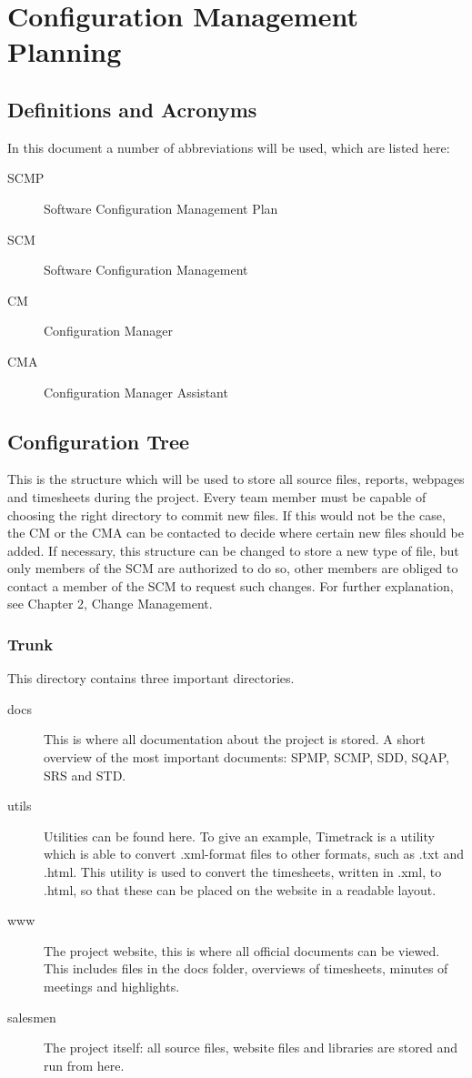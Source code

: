\chapter{Configuration Management Planning}

\section{Definitions and Acronyms}
In this document a number of abbreviations will be used, which are listed here:
\begin{description}
\item[SCMP]
Software Configuration Management Plan
\item[SCM]
Software Configuration Management
\item[CM]
Configuration Manager
\item[CMA]
Configuration Manager Assistant
\end{description}

\section{Configuration Tree}
This is the structure which will be used to store all source files, reports, webpages and timesheets during the project.
Every team member must be capable of choosing the right directory to commit new files.
If this would not be the case, the CM or the CMA can be contacted to decide where certain new files should be added.
If necessary, this structure can be changed to store a new type of file, but only members of the SCM are authorized to do so, other members are obliged to contact a member of the SCM to request such changes.
For further explanation, see Chapter 2, Change Management.

\subsection{Trunk}
This directory contains three important directories.
\begin{description}
\item[docs]
This is where all documentation about the project is stored. A short overview of the most important documents: SPMP, SCMP, SDD, SQAP, SRS and STD.
\item[utils]
Utilities can be found here.
To give an example, Timetrack is a utility which is able to convert .xml-format files to other formats, such as .txt and .html.
This utility is used to convert the timesheets, written in .xml, to .html, so that these can be placed on the website in a readable layout.
\item[www]
The project website, this is where all official documents can be viewed. This includes files in the docs folder, overviews of timesheets, minutes of meetings and highlights.
\item[salesmen]
The project itself: all source files, website files and libraries are stored and run from here.
\end{description}


